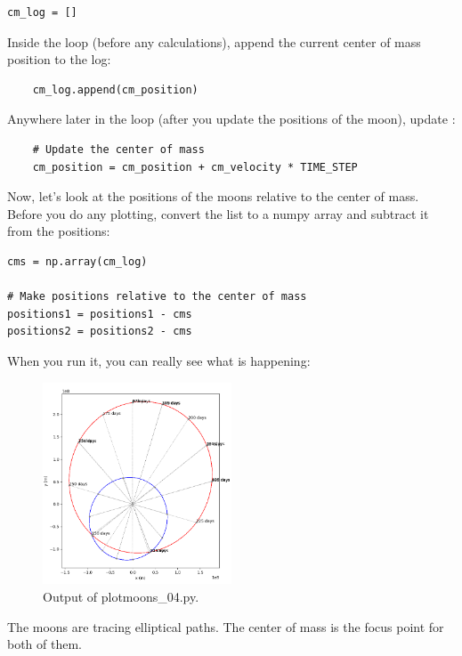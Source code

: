 \begin{verbatim}
cm_log = []
\end{verbatim}

Inside the loop (before any calculations),  append the current center of mass position to the log:

\begin{verbatim}
    cm_log.append(cm_position)
\end{verbatim}

Anywhere later in the loop (after you update the positions of the moon),  update :

\begin{verbatim}
    # Update the center of mass
    cm_position = cm_position + cm_velocity * TIME_STEP
\end{verbatim}

Now, let's look at the positions of the moons relative to the center of mass.   Before you do any plotting,  
convert the list to a numpy array and subtract it from the positions:

\begin{verbatim}
cms = np.array(cm_log)

# Make positions relative to the center of mass
positions1 = positions1 - cms
positions2 = positions2 - cms
\end{verbatim}

When you run it, you can really see what is happening:
\begin{figure}[htbp]
    \centering
    \includegraphics[width=0.5\textwidth]{plotmoons_04.png}
    \caption{Output of plotmoons\_04.py.}
    \label{fig:plotmoons_04}
\end{figure}

The moons are tracing elliptical paths.  The center of mass is the focus point for both of them.


